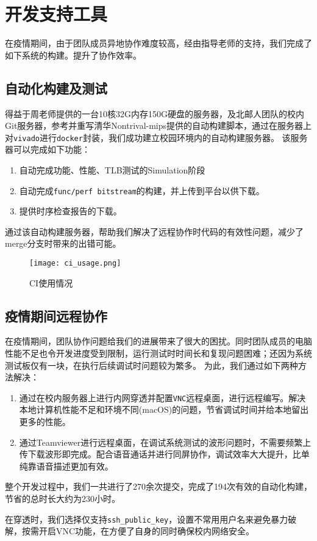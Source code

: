 \hypertarget{ux5f00ux53d1ux652fux6301}{%
\chapter{开发支持工具}\label{ux5f00ux53d1ux652fux6301}}

在疫情期间，由于团队成员异地协作难度较高，经由指导老师的支持，我们完成了如下系统的构建。提升了协作效率。

\hypertarget{ux81eaux52a8ux5316ux6784ux5efaux53caux6d4bux8bd5}{%
\section{自动化构建及测试}\label{ux81eaux52a8ux5316ux6784ux5efaux53caux6d4bux8bd5}}

得益于周老师提供的一台10核32G内存150G硬盘的服务器，及北邮人团队的校内Git服务器，参考并重写清华Nontrival-mips提供的自动构建脚本，通过在服务器上对\texttt{vivado}进行\texttt{docker}封装，我们成功建立校园环境内的自动构建服务器。
该服务器可以完成如下功能：

\begin{enumerate}
\item
  自动完成功能、性能、TLB测试的Simulation阶段
\item
  自动完成\texttt{func/perf\ bitstream}的构建，并上传到平台以供下载。
\item
  提供时序检查报告的下载。
\end{enumerate}

通过该自动构建服务器，帮助我们解决了远程协作时代码的有效性问题，减少了merge分支时带来的出错可能。

\begin{figure}[ht]
    \centering
    \texttt{[image: ci\_usage.png]}
    \caption{CI使用情况}
    \label{fig:ci-usage}
\end{figure}

\hypertarget{ux75abux60c5ux671fux95f4ux8fdcux7a0bux534fux4f5c}{%
\section{疫情期间远程协作}\label{ux75abux60c5ux671fux95f4ux8fdcux7a0bux534fux4f5c}}

在疫情期间，团队协作问题给我们的进展带来了很大的困扰。同时团队成员的电脑性能不足也令开发进度受到限制，运行测试时时间长和复现问题困难；还因为系统测试板仅有一块，在执行后续调试时问题较为繁多。
为此，我们通过如下两种方法解决：

\begin{enumerate}
\item
  通过在校内服务器上进行内网穿透并配置\texttt{VNC}远程桌面，进行远程编写。解决本地计算机性能不足和环境不同(macOS)的问题，节省调试时间并给本地留出更多的性能。
\item
  通过Teamviewer进行远程桌面，在调试系统测试的波形问题时，不需要频繁上传下载波形即完成。配合语音通话并进行同屏协作，调试效率大大提升，比单纯靠语音描述更加有效。
\end{enumerate}

整个开发过程中，我们一共进行了270余次提交，完成了194次有效的自动化构建，节省的总时长大约为230小时。

在穿透时，我们选择仅支持\texttt{ssh\_public\_key}，设置不常用用户名来避免暴力破解，按需开启VNC功能，在方便了自身的同时确保校内网络安全。

